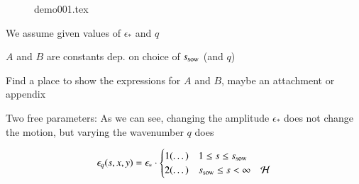 \begin{draft}
\begin{figure}[h]\label{fig:test}
    {demo001.tex}
\end{figure}

\begin{bullets}
    \item We assume given values of $\epsilon_\ast$ and $q$
    \item $A$ and $B$ are constants dep. on choice of $s_\mathrm{sow}$ (and $q$)
    \item Find a place to show the expressions for $A$ and $B$, maybe an attachment or appendix
    \item Two free parameters: As we can see, changing the amplitude $\epsilon_\ast$ does not change the motion, but varying the wavenumber $q$ does
\end{bullets}


\begin{equation}
    \epsilon_q(s, x, y) = \epsilon_\ast \cdot \begin{cases}
        1(\dots) & 1 \leq s \leq s_\mathrm{sow} \\
        2 (\dots)  &s_\mathrm{sow} \leq s < \infty \quad \mathcal{H}
    \end{cases}
\end{equation}


\end{draft}













